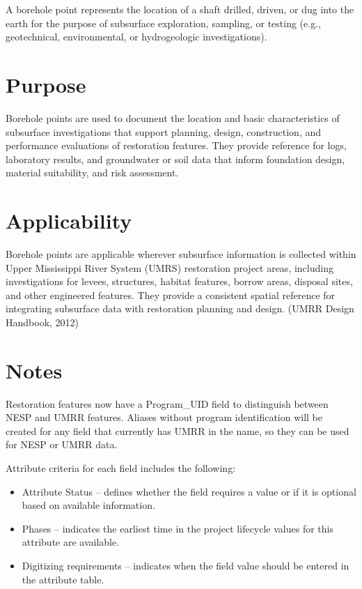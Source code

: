 \documentclass[
  letterpaper,
  DIV=11,
  numbers=noendperiod]{scrreprt}
\providecommand{\tightlist}{%
  \setlength{\itemsep}{0pt}\setlength{\parskip}{0pt}}
\begin{document}
A borehole point represents the location of a shaft drilled, driven, or
dug into the earth for the purpose of subsurface exploration, sampling,
or testing (e.g., geotechnical, environmental, or hydrogeologic
investigations).

\section{Purpose}\label{purpose-21}

Borehole points are used to document the location and basic
characteristics of subsurface investigations that support planning,
design, construction, and performance evaluations of restoration
features. They provide reference for logs, laboratory results, and
groundwater or soil data that inform foundation design, material
suitability, and risk assessment.

\section{Applicability}\label{applicability-18}

Borehole points are applicable wherever subsurface information is
collected within Upper Mississippi River System (UMRS) restoration
project areas, including investigations for levees, structures, habitat
features, borrow areas, disposal sites, and other engineered features.
They provide a consistent spatial reference for integrating subsurface
data with restoration planning and design. (UMRR Design Handbook, 2012)

\section{Notes}\label{notes-21}

Restoration features now have a Program\_UID field to distinguish
between NESP and UMRR features. Aliases without program identification
will be created for any field that currently has UMRR in the name, so
they can be used for NESP or UMRR data.

Attribute criteria for each field includes the following:

\begin{itemize}
\tightlist
\item
  Attribute Status -- defines whether the field requires a value or if
  it is optional based on available information.
\item
  Phases -- indicates the earliest time in the project lifecycle values
  for this attribute are available.
\item
  Digitizing requirements -- indicates when the field value should be
  entered in the attribute table.
\end{itemize}
\end{document}
